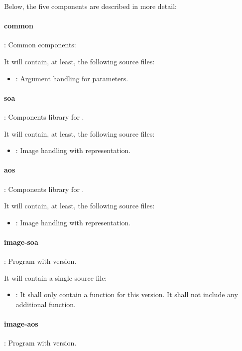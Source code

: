 Below, the five components are described in more detail:


\paragraph{common}: Common components:

It will contain, at least, the following source files:
\begin{itemize}
  \item {}: 
        Argument handling for  parameters. 
\end{itemize}

\paragraph{soa}: Components library for .

It will contain, at least, the following source files:
\begin{itemize}
  \item {}: 
        Image handling with  representation.
\end{itemize}

\paragraph{aos}: Components library for .

It will contain, at least, the following source files:
\begin{itemize}
  \item {}: 
        Image handling with  representation.
\end{itemize}

\paragraph{image-soa}: Program with  version.

It will contain a single source file:
\begin{itemize}
  \item {}: 
        It shall only contain a  function for this version.
        It shall not include any additional function.
\end{itemize}

\paragraph{image-aos}: Program with  version.

